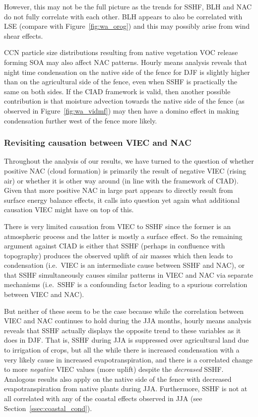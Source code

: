 However, this may not be the full picture as the trends for \ac{SSHF}, \ac{BLH} and \ac{NAC} do not fully correlate with each other. \ac{BLH} appears to also be correlated with \ac{LSE} (compare with Figure~\ref{fig:wa_orog}) and this may possibly arise from wind shear effects.

\ac{CCN} particle size distributions resulting from native vegetation \ac{VOC} release forming \ac{SOA} may also affect \ac{NAC} patterns. Hourly means analysis reveals that night time condensation on the native side of the fence for \ac{DJF} is slightly higher than on the agricultural side of the fence, even when \ac{SSHF} is practically the same on both sides. If the \ac{CIAD} framework is valid, then another possible contribution is that moisture advection towards the native side of the fence (as observed in Figure~\ref{fig:wa_vidmf}) may then have a domino effect in making condensation further west of the fence more likely.

\subsubsection{Revisiting causation between VIEC and NAC}

Throughout the analysis of our results, we have turned to the question of whether positive \ac{NAC} (cloud formation) is primarily the result of negative \ac{VIEC} (rising air) or whether it is other way around (in line with the framework of \ac{CIAD}). Given that more positive \ac{NAC} in large part appears to directly result from surface energy balance effects, it calls into question yet again what additional causation \ac{VIEC} might have on top of this.

There is very limited causation from \ac{VIEC} to \ac{SSHF} since the former is an atmospheric process and the latter is mostly a surface effect. So the remaining argument against \ac{CIAD} is either that \ac{SSHF} (perhaps in confluence with topography) produces the observed uplift of air masses which then leads to condensation (i.e.\ \ac{VIEC} is an intermediate cause between \ac{SSHF} and \ac{NAC}), or that \ac{SSHF} simultaneously causes similar patterns in \ac{VIEC} and \ac{NAC} via separate mechanisms (i.e.\ \ac{SSHF} is a confounding factor leading to a spurious correlation between \ac{VIEC} and \ac{NAC}).

But neither of these seem to be the case because while the correlation between \ac{VIEC} and \ac{NAC} continues to hold during the \ac{JJA} months, hourly means analysis reveals that \ac{SSHF} actually displays the opposite trend to these variables as it does in \ac{DJF}. That is, \ac{SSHF} during \ac{JJA} is suppressed over agricultural land due to irrigation of crops, but all the while there is increased condensation with a very likely cause in increased evapotranspiration, and there is a correlated change to more \textit{negative} \ac{VIEC} values (more uplift) despite the \textit{decreased} \ac{SSHF}. Analogous results also apply on the native side of the fence with decreased evapotranspiration from native plants during \ac{JJA}. Furthermore, \ac{SSHF} is not at all correlated with any of the coastal effects observed in \ac{JJA} (see Section~\ref{ssec:coastal_cond}).

